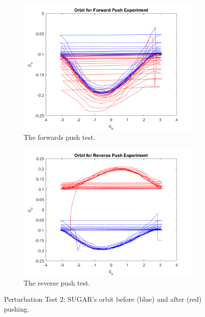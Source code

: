 \documentclass[journal,twoside,web, twocolumn,draftcls]{ieeecolor}
\begin{document}
\begin{figure}
    \centering
    \begin{subfigure}[ht]{0.49\linewidth}
        \includegraphics[width=\linewidth]{acrobot_fpush_orbit.png}
        \caption{The forwards push test.}
        \label{fig:acrobot-fpush-orbit}
    \end{subfigure}
    \begin{subfigure}[ht]{0.49\linewidth}
        \includegraphics[width=\linewidth]{acrobot_rpush_orbit.png}
        \caption{The reverse push test.}
        \label{fig:acrobot-rpush-orbit}
    \end{subfigure}
    \caption{Perturbation Test 2: SUGAR's orbit before (blue) and after (red) pushing.}
\end{figure}
\end{document}
